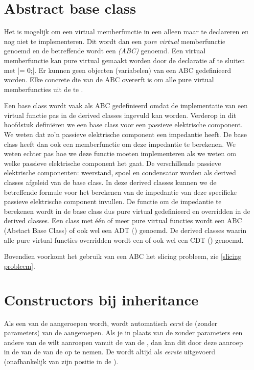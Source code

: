 \begin{cpplstShortInline}
\section{Abstract base class}
\label{sec:abc}
Het is mogelijk om een virtual memberfunctie in een  alleen maar te declareren en nog niet te implementeren.
Dit wordt dan een \label{pure virtual}\emph{pure virtual} memberfunctie genoemd en de betreffende  wordt een \emph{ (ABC)} genoemd.
Een virtual memberfunctie kan pure virtual gemaakt worden door de declaratie af te sluiten met |= 0;|.
Er kunnen geen objecten (variabelen) van een ABC gedefinieerd worden.
Elke concrete  die van de ABC overerft is  om alle pure virtual memberfuncties uit de  te .

Een base class wordt vaak als ABC gedefinieerd omdat de implementatie van een virtual functie pas in de derived classes ingevuld kan worden. 
Verderop in dit hoofdstuk definiëren we een base class voor een passieve elektrische component.
We weten dat zo'n passieve elektrische component een impedantie heeft.
De base class heeft dan ook een memberfunctie om deze impedantie te berekenen.
We weten echter pas hoe we deze functie moeten implementeren als we weten om welke passieve elektrische component het gaat.
De verschillende passieve elektrische componenten: weerstand, spoel en condensator worden als derived classes afgeleid van de base class.
In deze derived classes kunnen we de betreffende formule voor het berekenen van de impedantie van deze specifieke passieve elektrische component invullen.
De functie om de impedantie te berekenen wordt in de base class dus pure virtual gedefinieerd en overridden in de derived classes.
Een class met één of meer pure virtual functies wordt een ABC (Abstact Base Class) of ook wel een ADT () genoemd.
De derived classes waarin alle pure virtual functies overridden wordt een  of ook wel een CDT () genoemd. 

Bovendien voorkomt het gebruik van een ABC het slicing probleem, zie \cref{slicing probleem}.

\section{Constructors bij inheritance}
\label{constructors bij inheritance}
Als een  van de  aangeroepen wordt, wordt automatisch \emph{eerst} de  (zonder parameters) van de  aangeroepen.
Als je in plaats van de  zonder parameters een andere  van de  wilt aanroepen vanuit de  van de , dan kan dit door deze aanroep in de  van de  van de  op te nemen.
De  wordt altijd als \emph{eerste} uitgevoerd (onafhankelijk van zijn positie in de ).


\end{cpplstShortInline}
